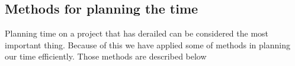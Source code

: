 \subsection{Methods for planning the time}
Planning time on a project that has derailed can be considered the most important thing. Because of this we have applied some of methods in planning our time efficiently. Those methods are described below



